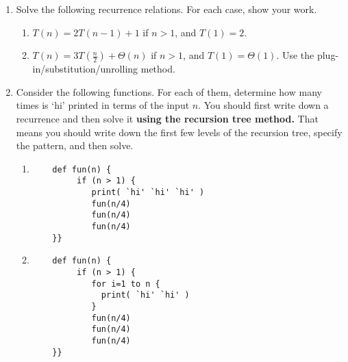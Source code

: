 \documentclass[12pt]{article}
\begin{document}
\begin{enumerate}

\item Solve the following recurrence relations. For each case, show your work.
\begin{enumerate}
             
        \item \label{1a} $T(n) = 2T(n-1) + 1$ if $n>1$, and $T(1) = 2$.

        
        \pagebreak        
        
        
	\item \label{1b} $T(n) =  3T(\frac{n}{2})+\Theta (n)$ if $n>1$, and $T(1) = \Theta (1)$. Use the plug-in/substitution/unrolling method.

	\end{enumerate}

\pagebreak
\item Consider the following functions. For each of them, determine how many times is `hi' printed in terms of the input $n$. You should first write down a recurrence and then solve it \textbf{using the recursion tree method.} That means you should write down the first few levels of the recursion tree, specify the pattern, and then solve.

\begin{enumerate}

\item \label{2a} 
	\begin{small}
	\begin{verbatim}
	def fun(n) {
	     if (n > 1) {
	        print( `hi' `hi' `hi' )
	        fun(n/4)
	        fun(n/4)
	        fun(n/4)
	}}
	\end{verbatim}
	\end{small}


\pagebreak 

\item \label{2b}

\begin{small}
	\begin{verbatim}
	def fun(n) {
	     if (n > 1) {
	        for i=1 to n {
	          print( `hi' `hi' )
	        }
	        fun(n/4)
	        fun(n/4)
	        fun(n/4)
	}}
	\end{verbatim}
	\end{small}
	


\end{enumerate}
\end{enumerate}
\end{document}
